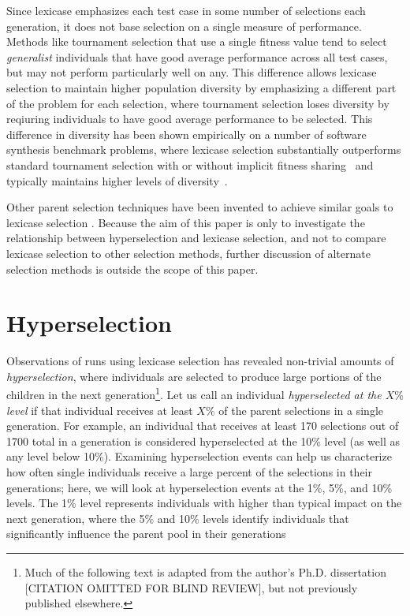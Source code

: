 \documentclass{sig-alternate}
\newcommand{\definition}[1]{\textit{#1}}
\begin{document}
Since lexicase emphasizes each test case in some number of selections each generation, it does not base selection on a single measure of performance. Methods like tournament selection that use a single fitness value tend to select \textit{generalist} individuals that have good average performance across all test cases, but may not perform particularly well on any. This difference allows lexicase selection to maintain higher population diversity by emphasizing a different part of the problem for each selection, where tournament selection loses diversity by reqiuring individuals to have good average performance to be selected. This difference in diversity has been shown empirically on a number of software synthesis benchmark problems, where lexicase selection substantially outperforms standard tournament selection with or without implicit fitness sharing~\cite{Helmuth:2015:GECCO,Helmuth:2015:dissertation} and typically maintains higher levels of diversity~\cite{Helmuth:2015:GPTP}.

Other parent selection techniques have been invented to achieve similar goals to lexicase selection \cite{Fieldsend:2015:GECCO, Krawiec:ppsn2010, Krawiec:2015:EuroGP, Galvan-Lopez:2013:CEC}. Because the aim of this paper is only to investigate the relationship between hyperselection and lexicase selection, and not to compare lexicase selection to other selection methods, further discussion of alternate selection methods is outside the scope of this paper.


\section[Hyperselection]{Hyperselection}
\label{section:hyperselection}

Observations of runs using lexicase selection has revealed non-trivial amounts of \definition{hyperselection}, where individuals are selected to produce large portions of the children in the next generation\footnote{Much of the following text is adapted from the author's Ph.D. dissertation
[CITATION OMITTED FOR BLIND REVIEW],
but not previously published elsewhere.}. Let us call an individual \definition{hyperselected at the $X\%$ level} if that individual receives at least $X\%$ of the parent selections in a single generation. For example, an individual that receives at least 170 selections out of 1700 total in a generation is considered hyperselected at the 10\% level (as well as any level below 10\%). Examining hyperselection events can help us characterize how often single individuals receive a large percent of the selections in their generations; here, we will %
look at hyperselection events at the 1\%, 5\%, and 10\% levels. The 1\% level represents individuals with higher than typical impact on the next generation, where the 5\% and 10\% levels identify individuals that significantly influence the parent pool in their generations
\end{document}
